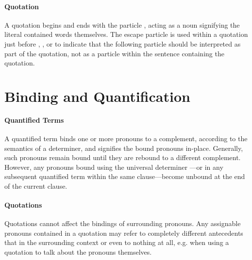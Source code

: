 
\paragraph{Quotation} A quotation begins and ends with the particle ,
acting as a noun signifying the literal contained words themselves. The escape
particle  is used within a quotation just before ,
, or  to indicate that the following particle should be
interpreted as part of the quotation, not as a particle within the sentence
containing the quotation.


\section{Binding and Quantification} \label{sec:binding}

\paragraph{Quantified Terms} A quantified term binds one or more pronouns to a
complement, according to the semantics of a determiner, and signifies the bound
pronouns in-place. Generally, such pronouns remain bound until they are rebound
to a different complement. However, any pronouns bound using the universal
determiner ---or in any subsequent quantified term within the same
clause---become unbound at the end of the current clause.



\paragraph{Quotations} Quotations cannot affect the bindings of surrounding
pronouns. Any assignable pronouns contained in a quotation may refer to
completely different antecedents that in the surrounding context or even to
nothing at all, e.g. when using a quotation to talk about the pronouns
themselves.

